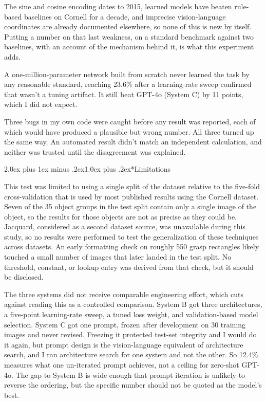 \documentclass[12pt,letterpaper]{article}
\makeatletter
\renewcommand{\section}{\@startsection{section}{1}{0pt}%
  {2.0ex plus 1ex minus .2ex}{1.0ex plus .2ex}{\normalsize\bfseries}}
\makeatother
\begin{document}
The sine and cosine encoding dates to 2015, learned models have beaten
rule-based baselines on Cornell for a decade, and imprecise
vision-language coordinates are already documented elsewhere, so none
of this is new by itself. Putting a number on that last weakness, on a
standard benchmark against two baselines, with an account of the
mechanism behind it, is what this experiment adds.

A one-million-parameter network built from scratch never learned the
task by any reasonable standard, reaching 23.6\% after a learning-rate
sweep confirmed that wasn't a tuning artifact. It still beat GPT-4o
(System C) by 11 points, which I did not expect.

Three bugs in my own code were caught before any result was reported,
each of which would have produced a plausible but wrong number. All
three turned up the same way. An automated result didn't match an
independent calculation, and neither was trusted until the disagreement
was explained.

\section*{Limitations}

This test was limited to using a single split of the dataset relative
to the five-fold cross-validation that is used by most published
results using the Cornell dataset. Seven of the 35 object groups in the
test split contain only a single image of the object, so the results for
those objects are not as precise as they could be. Jacquard, considered
as a second dataset source, was unavailable during this study, so no
results were performed to test the generalization of these techniques
across datasets. An early formatting check on roughly 550 grasp
rectangles likely touched a small number of images that later landed in
the test split. No threshold, constant, or lookup entry was derived
from that check, but it should be disclosed.

The three systems did not receive comparable engineering effort, which
cuts against reading this as a controlled comparison. System B got three
architectures, a five-point learning-rate sweep, a tuned loss weight,
and validation-based model selection. System C got one prompt, frozen
after development on 30 training images and never revised. Freezing it
protected test-set integrity and I would do it again, but prompt design
is the vision-language equivalent of architecture search, and I ran
architecture search for one system and not the other. So 12.4\%
measures what one un-iterated prompt achieves, not a ceiling for
zero-shot GPT-4o. The gap to System B is wide enough that prompt
iteration is unlikely to reverse the ordering, but the specific number
should not be quoted as the model's best.
\end{document}
